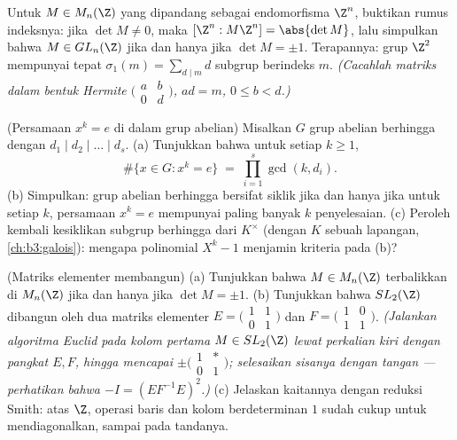 \begin{exercise}[$\star\star\star$]\label{exo:b3:modules:10}
Untuk $M \in M_n(\Z)$ yang dipandang sebagai endomorfisma $\Z^n$, buktikan
rumus indeksnya: jika $\det M \ne 0$, maka
$[\Z^n : M\Z^n] = \abs{\det M}$, lalu simpulkan bahwa $M \in GL_n(\Z)$
jika dan hanya jika $\det M = \pm 1$. Terapannya: grup $\Z^2$ mempunyai tepat
$\sigma_1(m) = \sum_{d \mid m} d$ subgrup berindeks $m$.
\emph{(Cacahlah matriks dalam bentuk Hermite $\bigl(\begin{smallmatrix}
a & b\\ 0 & d\end{smallmatrix}\bigr)$, $ad = m$, $0 \leq b <
d$.)}
\end{exercise}

\begin{exercise}[$\star\star$]\label{exo:b3:modules:11}
(Persamaan $x^k = e$ di dalam grup abelian) Misalkan $G$ grup abelian
berhingga dengan  $d_1 \mid d_2 \mid \dots
\mid d_s$.
(a) Tunjukkan bahwa untuk setiap $k \geq 1$,
\[
\#\{x \in G : x^k = e\} \;=\; \prod_{i=1}^{s}\gcd(k, d_i) .
\]
(b) Simpulkan: grup abelian berhingga bersifat siklik jika dan hanya jika
untuk setiap $k$, persamaan $x^k = e$ mempunyai paling banyak $k$
penyelesaian.
(c) Peroleh kembali kesiklikan subgrup berhingga dari $K^\times$
(dengan $K$ sebuah lapangan, \cref{ch:b3:galois}): mengapa polinomial
$X^k - 1$ menjamin kriteria pada (b)?
\end{exercise}

\begin{exercise}[$\star\star\star$]\label{exo:b3:modules:12}
(Matriks elementer membangun) (a) Tunjukkan bahwa $M \in M_n(\Z)$
terbalikkan di $M_n(\Z)$ jika dan hanya jika $\det M = \pm1$.
(b) Tunjukkan bahwa $SL_2(\Z)$ dibangun oleh dua matriks
elementer
$E = \bigl(\begin{smallmatrix}1 & 1\\ 0 &
1\end{smallmatrix}\bigr)$ dan
$F = \bigl(\begin{smallmatrix}1 & 0\\ 1 &
1\end{smallmatrix}\bigr)$.
\emph{(Jalankan algoritma Euclid pada kolom pertama $M
\in SL_2(\Z)$ lewat perkalian kiri dengan pangkat $E, F$,
hingga mencapai $\pm\bigl(\begin{smallmatrix}1 & *\\ 0 &
1\end{smallmatrix}\bigr)$; selesaikan sisanya dengan tangan --- perhatikan
bahwa $-I = (EF^{-1}E)^2$.)}
(c) Jelaskan kaitannya dengan reduksi Smith: atas $\Z$,
operasi baris dan kolom berdeterminan $1$ sudah cukup untuk
mendiagonalkan, sampai pada tandanya.
\end{exercise}

